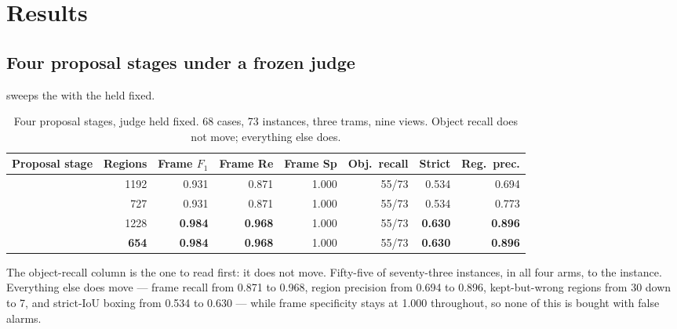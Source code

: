 \section{Results}
\label{sec:results}

\subsection{Four proposal stages under a frozen judge}
\label{sec:results:main}

 sweeps the \proposer{} with the \judge{} held fixed.

\begin{table}[t]
\centering
\caption{Four proposal stages, judge held fixed. 68 cases, 73 instances, three
trams, nine views. Object recall does not move; everything else does.}
\label{tab:main}
\small
\setlength{\tabcolsep}{4.5pt}
\begin{tabular}{@{}lrrrrrrr@{}}
\toprule
\textbf{Proposal stage} & \textbf{Regions} & \textbf{Frame $F_1$} &
\textbf{Frame Re} & \textbf{Frame Sp} & \textbf{Obj.\ recall} &
\textbf{Strict} & \textbf{Reg.\ prec.} \\
\midrule
\armphoto{}          & 1192 & 0.931 & 0.871 & 1.000 & 55/73 & 0.534 & 0.694 \\
\armphotodino{}      &  727 & 0.931 & 0.871 & 1.000 & 55/73 & 0.534 & 0.773 \\
\armdino{}           & 1228 & \textbf{0.984} & \textbf{0.968} & 1.000 & 55/73 & \textbf{0.630} & \textbf{0.896} \\
\armdinodinomaly{}   & \textbf{654} & \textbf{0.984} & \textbf{0.968} & 1.000 & 55/73 & \textbf{0.630} & \textbf{0.896} \\
\bottomrule
\end{tabular}
\end{table}

The object-recall column is the one to read first: it does not move.
Fifty-five of seventy-three instances, in all four arms, to the instance.
Everything else does move --- frame recall from 0.871 to 0.968, region
precision from 0.694 to 0.896, kept-but-wrong regions from 30 down to 7, and
strict-IoU boxing from 0.534 to 0.630 --- while frame specificity stays at
1.000 throughout, so none of this is bought with false alarms.

